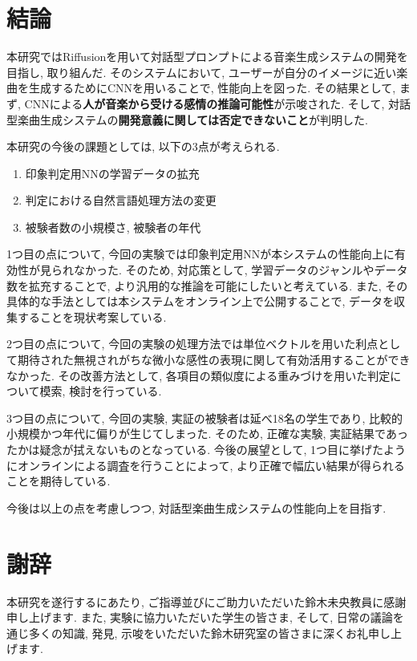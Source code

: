 \documentclass[a4paper,11pt,dvipdfmx]{jreport}
\begin{document}
\chapter{結論}
本研究ではRiffusionを用いて対話型プロンプトによる音楽生成システムの開発を目指し, 取り組んだ.
そのシステムにおいて, ユーザーが自分のイメージに近い楽曲を生成するためにCNNを用いることで, 性能向上を図った.
その結果として, まず, CNNによる\textbf{人が音楽から受ける感情の推論可能性}が示唆された.
そして, 対話型楽曲生成システムの\textbf{開発意義に関しては否定できないこと}が判明した.

本研究の今後の課題としては, 以下の3点が考えられる.
\begin{enumerate}
  \item 印象判定用NNの学習データの拡充
  \item 判定における自然言語処理方法の変更
  \item 被験者数の小規模さ, 被験者の年代
\end{enumerate}

1つ目の点について, 今回の実験では印象判定用NNが本システムの性能向上に有効性が見られなかった.
そのため, 対応策として, 学習データのジャンルやデータ数を拡充することで, より汎用的な推論を可能にしたいと考えている. また, その具体的な手法としては本システムをオンライン上で公開することで, データを収集することを現状考案している.

2つ目の点について, 今回の実験の処理方法では単位ベクトルを用いた利点として期待された無視されがちな微小な感性の表現に関して有効活用することができなかった. その改善方法として, 各項目の類似度による重みづけを用いた判定について模索, 検討を行っている. 

3つ目の点について, 今回の実験, 実証の被験者は延べ18名の学生であり, 比較的小規模かつ年代に偏りが生じてしまった. そのため, 正確な実験, 実証結果であったかは疑念が拭えないものとなっている. 今後の展望として, 1つ目に挙げたようにオンラインによる調査を行うことによって, より正確で幅広い結果が得られることを期待している.

今後は以上の点を考慮しつつ, 対話型楽曲生成システムの性能向上を目指す.

\chapter*{謝辞}
本研究を遂行するにあたり, ご指導並びにご助力いただいた鈴木未央教員に感謝申し上げます.
また, 実験に協力いただいた学生の皆さま, そして, 日常の議論を通じ多くの知識, 発見, 示唆をいただいた鈴木研究室の皆さまに深くお礼申し上げます.
\end{document}
